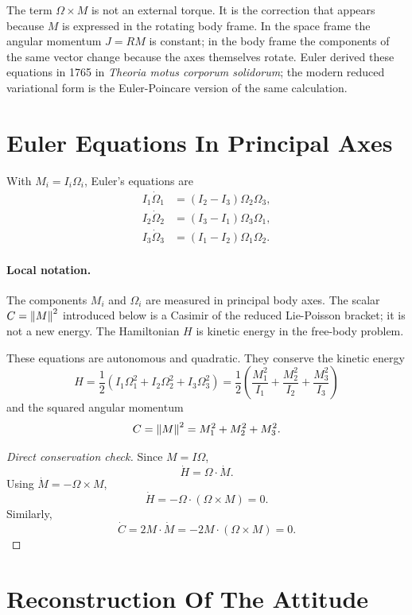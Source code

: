 The term \(\Omega\times M\) is not an external torque. It is the correction
that appears because \(M\) is expressed in the rotating body frame. In the
space frame the angular momentum \(J=RM\) is constant; in the body frame the
components of the same vector change because the axes themselves rotate.
Euler derived these equations in 1765 in \emph{Theoria motus corporum
solidorum}; the modern reduced variational form is the Euler-Poincare version
of the same calculation.

\section{Euler Equations In Principal Axes}
\label{sec:euler-equations-principal}

With \(M_i=I_i\Omega_i\), Euler's equations are
\[
\begin{aligned}
  I_1\dot\Omega_1 &= (I_2-I_3)\Omega_2\Omega_3,\\
  I_2\dot\Omega_2 &= (I_3-I_1)\Omega_3\Omega_1,\\
  I_3\dot\Omega_3 &= (I_1-I_2)\Omega_1\Omega_2.
\end{aligned}
\]

\paragraph{Local notation.}
The components \(M_i\) and \(\Omega_i\) are measured in principal body axes.
The scalar \(C=\left\lVert M\right\rVert^2\) introduced below is a Casimir of the reduced
Lie-Poisson bracket; it is not a new energy.  The Hamiltonian \(H\) is kinetic
energy in the free-body problem.

These equations are autonomous and quadratic. They conserve the kinetic energy
\[
  H=\frac12(I_1\Omega_1^2+I_2\Omega_2^2+I_3\Omega_3^2)
  =
  \frac12\left(\frac{M_1^2}{I_1}+\frac{M_2^2}{I_2}+\frac{M_3^2}{I_3}\right)
\]
and the squared angular momentum
\[
  C=\left\lVert M\right\rVert^2=M_1^2+M_2^2+M_3^2.
\]

\begin{proof}[Direct conservation check]
Since \(M=I\Omega\),
\[
  \dot H=\Omega\cdot \dot M.
\]
Using \(\dot M=-\Omega\times M\),
\[
  \dot H=-\Omega\cdot(\Omega\times M)=0.
\]
Similarly,
\[
  \dot C=2M\cdot\dot M=-2M\cdot(\Omega\times M)=0.
\]
\end{proof}

\section{Reconstruction Of The Attitude}
\label{sec:rigid-attitude-reconstruction}

